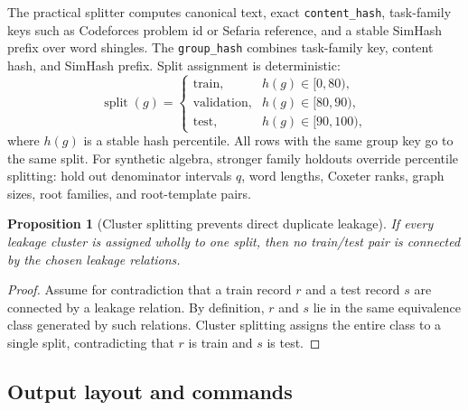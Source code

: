\documentclass[11pt]{article}
\theoremstyle{definition}
\theoremstyle{plain}
\newtheorem{proposition}[definition]{Proposition}
\theoremstyle{remark}
\numberwithin{equation}{section}
\begin{document}
The practical splitter computes canonical text, exact \texttt{content\_hash}, task-family keys such as Codeforces problem id or Sefaria reference, and a stable SimHash prefix over word shingles.  The \texttt{group\_hash} combines task-family key, content hash, and SimHash prefix.  Split assignment is deterministic:
\begin{equation}
  \operatorname{split}(g)=
  \begin{cases}
  \text{train}, & h(g)\in[0,80),\\
  \text{validation}, & h(g)\in[80,90),\\
  \text{test}, & h(g)\in[90,100),
  \end{cases}
\end{equation}
where $h(g)$ is a stable hash percentile.  All rows with the same group key go to the same split.  For synthetic algebra, stronger family holdouts override percentile splitting: hold out denominator intervals $q$, word lengths, Coxeter ranks, graph sizes, root families, and root-template pairs.

\begin{proposition}[Cluster splitting prevents direct duplicate leakage]
If every leakage cluster is assigned wholly to one split, then no train/test pair is connected by the chosen leakage relations.
\end{proposition}

\begin{proof}
Assume for contradiction that a train record $r$ and a test record $s$ are connected by a leakage relation.  By definition, $r$ and $s$ lie in the same equivalence class generated by such relations.  Cluster splitting assigns the entire class to a single split, contradicting that $r$ is train and $s$ is test.
\end{proof}

\subsection{Output layout and commands}
\end{document}
